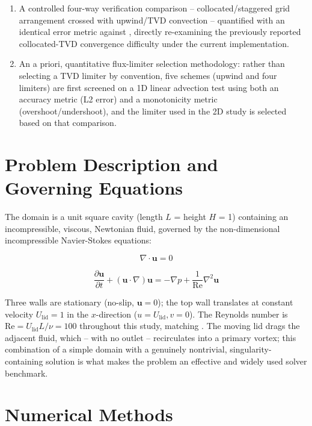 \documentclass[CHICAGO]{USG}
\begin{document}
\begin{enumerate}
\item A controlled four-way verification comparison -- collocated/staggered grid arrangement crossed with upwind/TVD convection -- quantified with an identical error metric against \citet{ghia1982}, directly re-examining the previously reported collocated-TVD convergence difficulty under the current implementation.
\item An a priori, quantitative flux-limiter selection methodology: rather than selecting a TVD limiter by convention, five schemes (upwind and four limiters) are first screened on a 1D linear advection test using both an accuracy metric (L2 error) and a monotonicity metric (overshoot/undershoot), and the limiter used in the 2D study is selected based on that comparison.
\end{enumerate}

\section{Problem Description and Governing Equations}

The domain is a unit square cavity (length $L$ = height $H$ = 1) containing an incompressible, viscous, Newtonian fluid, governed by the non-dimensional incompressible Navier-Stokes equations:

\begin{equation}
\nabla \cdot \mathbf{u} = 0
\label{eq:continuity}
\end{equation}

\begin{equation}
\frac{\partial \mathbf{u}}{\partial t} + (\mathbf{u} \cdot \nabla)\mathbf{u} = -\nabla p + \frac{1}{\mathrm{Re}}\nabla^2 \mathbf{u}
\label{eq:momentum}
\end{equation}

Three walls are stationary (no-slip, $\mathbf{u} = 0$); the top wall translates at constant velocity $U_{\mathrm{lid}} = 1$ in the $x$-direction ($u = U_{\mathrm{lid}}, v = 0$). The Reynolds number is $\mathrm{Re} = U_{\mathrm{lid}} L / \nu = 100$ throughout this study, matching \citet{ghia1982}. The moving lid drags the adjacent fluid, which -- with no outlet -- recirculates into a primary vortex; this combination of a simple domain with a genuinely nontrivial, singularity-containing solution is what makes the problem an effective and widely used solver benchmark.

\section{Numerical Methods}
\end{document}
